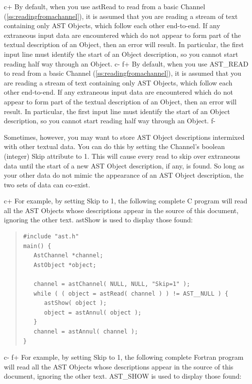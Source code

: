 \documentclass[twoside,11pt]{article}
\newcommand{\secref}[1]{\S\ref{#1}}
\renewcommand{\secref}[1]{\ref{#1}}
\begin{document}
c+
By default, when you use astRead to read from a basic Channel
(\secref{ss:readingfromachannel}), it is assumed that you are reading a
stream of text containing only AST Objects, which follow each other
end-to-end. If any extraneous input data are encountered which do not
appear to form part of the textual description of an Object, then an
error will result. In particular, the first input line must identify
the start of an Object description, so you cannot start reading half
way through an Object.
c-
f+
By default, when you use AST\_READ to read from a basic Channel
(\secref{ss:readingfromachannel}), it is assumed that you are reading a
stream of text containing only AST Objects, which follow each other
end-to-end. If any extraneous input data are encountered which do not
appear to form part of the textual description of an Object, then an
error will result. In particular, the first input line must identify
the start of an Object description, so you cannot start reading half
way through an Object.
f-

Sometimes, however, you may want to store AST Object descriptions
intermixed with other textual data. You can do this by setting the
Channel's boolean (integer) Skip attribute to 1. This will cause every
read to skip over extraneous data until the start of a new AST Object
description, if any, is found. So long as your other data do not mimic
the appearance of an AST Object description, the two sets of data can
co-exist.

c+
For example, by setting Skip to 1, the following complete C program
will read all the AST Objects whose descriptions appear in the source
of this document, ignoring the other text. astShow is used to display
those found:

\begin{quote}
\small
\begin{verbatim}
#include "ast.h"
main() {
   AstChannel *channel;
   AstObject *object;

   channel = astChannel( NULL, NULL, "Skip=1" );
   while ( ( object = astRead( channel ) ) != AST__NULL ) {
      astShow( object );
      object = astAnnul( object );
   }
   channel = astAnnul( channel );
}
\end{verbatim}
\normalsize
\end{quote}
c-
f+
For example, by setting Skip to 1, the following complete Fortran
program will read all the AST Objects whose descriptions appear in the
source of this document, ignoring the other text. AST\_SHOW is used to
display those found:
\end{document}
